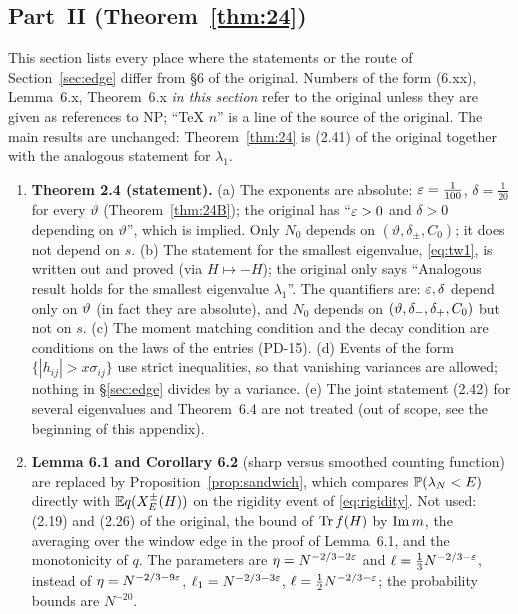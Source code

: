 \subsection{Part~II (Theorem~\ref{thm:24})}\label{app:diffB}
This section lists every place where the statements or the route of Section~\ref{sec:edge} differ from \S6 of the original. Numbers of the form (6.xx), Lemma~6.x, Theorem~6.x \emph{in this section}
refer to the original unless they are given as references to NP; ``TeX $n$'' is a line of the source of the original. The main results are unchanged: Theorem~\ref{thm:24} is (2.41) of the original
together with the analogous statement for $\lambda_1$.

\begin{enumerate}\itemsep2pt
\item[\textbf{II.1.}] \textbf{Theorem 2.4 (statement).}
(a) The exponents are absolute: $\e=\frac1{100}$, $\delta=\frac1{20}$ for every $\vartheta$ (Theorem~\ref{thm:24B}); the original has ``$\e>0$ and $\delta>0$ depending on $\vartheta$'', which is implied. Only $N_0$ depends on
$(\vartheta,\delta_\pm,C_0)$; it does not depend on $s$.
(b) The statement for the smallest eigenvalue, \eqref{eq:tw1}, is written out and proved (via $H\mapsto-H$); the original only says ``Analogous result holds for the smallest eigenvalue $\lambda_1$''.
The quantifiers are: $\eps,\delta$ depend only on $\vth$ (in fact they are absolute), and $N_0$ depends on $(\vth,\delta_-,\delta_+,C_0)$ but not on $s$.
(c) The moment matching condition and the decay condition are conditions on the laws of the entries (PD-15).
(d) Events of the form $\{|h_{ij}|>x\sigma_{ij}\}$ use strict inequalities, so that vanishing variances are allowed; nothing in \S\ref{sec:edge} divides by a variance.
(e) The joint statement (2.42) for several eigenvalues and Theorem~6.4 are not treated (out of scope, see the beginning of this appendix).

\item[\textbf{II.2.}] \textbf{Lemma 6.1 and Corollary 6.2} (sharp versus smoothed counting function) are replaced by Proposition~\ref{prop:sandwich}, which compares $\P(\lambda_N<E)$ directly with
$\E q(X^\pm_E(H))$ on the rigidity event of \eqref{eq:rigidity}. Not used: (2.19) and (2.26) of the original, the bound of $\tr f(H)$ by $\im m$, the averaging over the window edge in the proof of Lemma~6.1, and the monotonicity
of $q$. The parameters are $\eta=N^{-2/3-2\e}$ and $\ell=\frac13N^{-2/3-\e}$, instead of $\eta=N^{-2/3-9\e}$, $\ell_1=N^{-2/3-3\e}$, $\ell=\frac12N^{-2/3-\e}$; the probability bounds are $N^{-20}$.


\end{enumerate}
